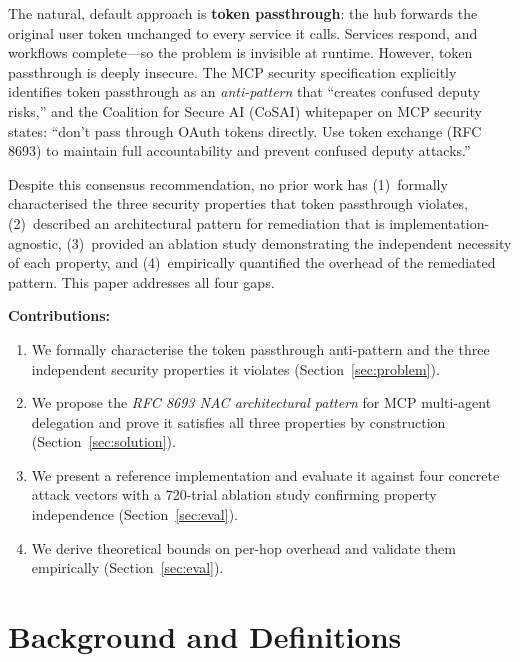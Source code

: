 \documentclass[journal]{IEEEtran}
\begin{document}
The natural, default approach is \textbf{token passthrough}: the hub forwards
the original user token unchanged to every service it calls. Services respond,
and workflows complete---so the problem is invisible at runtime. However,
token passthrough is deeply insecure. The MCP security specification \cite{mcp_security} explicitly
identifies token passthrough as an \textit{anti-pattern} that ``creates confused
deputy risks,'' and the Coalition for Secure AI (CoSAI) whitepaper on MCP
security \cite{cosai_mcp} states: ``don't pass through OAuth tokens directly.
Use token exchange (RFC 8693) to maintain full accountability and prevent confused
deputy attacks.''

Despite this consensus recommendation, no prior work has (1)~formally
characterised the three security properties that token passthrough violates,
(2)~described an architectural pattern for remediation that is
implementation-agnostic, (3)~provided an ablation study demonstrating the
independent necessity of each property, and (4)~empirically quantified the
overhead of the remediated pattern. This paper addresses all four gaps.

\textbf{Contributions:}
\begin{enumerate}
  \item We formally characterise the token passthrough anti-pattern and the three
        independent security properties it violates
        (Section~\ref{sec:problem}).
  \item We propose the \textit{RFC 8693 NAC architectural pattern} for MCP
        multi-agent delegation and prove it satisfies all three properties by
        construction (Section~\ref{sec:solution}).
  \item We present a reference implementation and evaluate it against four
        concrete attack vectors with a 720-trial ablation study confirming
        property independence (Section~\ref{sec:eval}).
  \item We derive theoretical bounds on per-hop overhead and validate them
        empirically (Section~\ref{sec:eval}).
\end{enumerate}

\section{Background and Definitions}
\label{sec:background}
\end{document}
